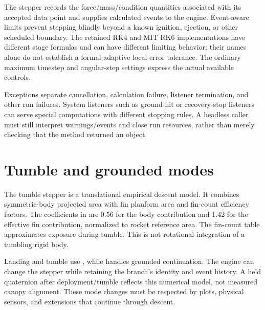 The stepper records the force/mass/condition quantities associated with its accepted data point and supplies calculated events to the engine. Event-aware limits prevent stepping blindly beyond a known ignition, ejection, or other scheduled boundary. The retained RK4 and MIT RK6 implementations have different stage formulas and can have different limiting behavior; their names alone do not establish a formal adaptive local-error tolerance. The ordinary maximum timestep and angular-step settings express the actual available controls.

Exceptions separate cancellation, calculation failure, listener termination, and other run failures. System listeners such as ground-hit or recovery-stop listeners can serve special computations with different stopping rules. A headless caller must still interpret warnings/events and close run resources, rather than merely checking that the method returned an object.

\section{Tumble and grounded modes}
The tumble stepper is a translational empirical descent model. It combines symmetric-body projected area with fin planform area and fin-count efficiency factors. The coefficients in  are 0.56 for the body contribution and 1.42 for the effective fin contribution, normalized to rocket reference area. The fin-count table approximates exposure during tumble. This is not rotational integration of a tumbling rigid body.

Landing and tumble use , while  handles grounded continuation. The engine can change the stepper while retaining the branch's identity and event history. A held quaternion after deployment/tumble reflects this numerical model, not measured canopy alignment. These mode changes must be respected by plots, physical sensors, and extensions that continue through descent.

